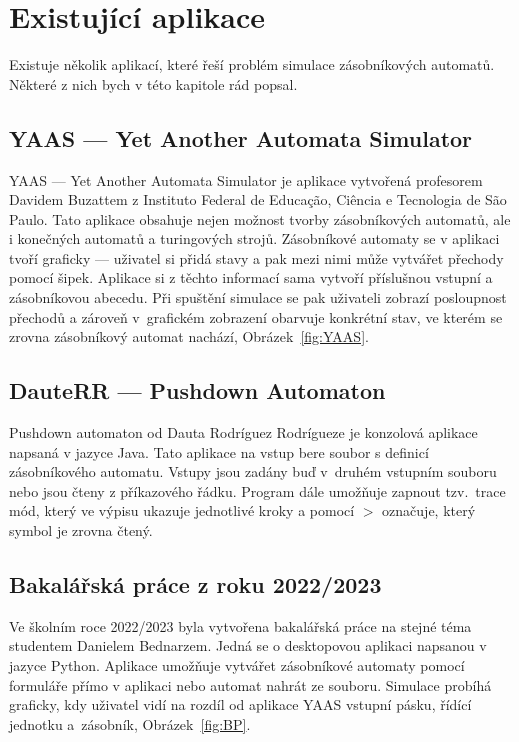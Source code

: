 \chapter{Existující aplikace}\label{chap:ExistingApps}

Existuje několik aplikací, které řeší problém simulace zásobníkových automatů. Některé z nich bych v této kapitole rád popsal.~\cite{Buzatto2023}~\cite{Rodriguez2018}~\cite{Bednarz2023}

\section{YAAS --- Yet Another Automata Simulator}

YAAS --- Yet Another Automata Simulator je aplikace vytvořená profesorem Davidem Buzattem z Instituto Federal de Educação, Ciência e Tecnologia de São Paulo. Tato aplikace obsahuje nejen možnost tvorby zásobníkových automatů, ale i konečných automatů a turingových strojů. Zásobníkové automaty se v aplikaci tvoří graficky --- uživatel si přidá stavy a pak mezi nimi může vytvářet přechody pomocí šipek. Aplikace si z těchto informací sama vytvoří příslušnou vstupní a zásobníkovou abecedu. Při spuštění simulace se pak uživateli zobrazí posloupnost přechodů a zároveň v~grafickém zobrazení obarvuje konkrétní stav, ve kterém se zrovna zásobníkový automat nachází, Obrázek~\ref{fig:YAAS}.

\section{DauteRR --- Pushdown Automaton}

Pushdown automaton od Dauta Rodríguez Rodrígueze je konzolová aplikace napsaná v jazyce Java. Tato aplikace na vstup bere soubor s definicí zásobníkového automatu. Vstupy jsou zadány buď v~druhém vstupním souboru nebo jsou čteny z příkazového řádku. Program dále umožňuje zapnout tzv.~trace mód, který ve výpisu ukazuje jednotlivé kroky a pomocí $>$ označuje, který symbol je zrovna čtený.

\section{Bakalářská práce z roku 2022/2023}

Ve školním roce 2022/2023 byla vytvořena bakalářská práce na stejné téma studentem Danielem Bednarzem. Jedná se o desktopovou aplikaci napsanou v jazyce Python. Aplikace umožňuje vytvářet zásobníkové automaty pomocí formuláře přímo v aplikaci nebo automat nahrát ze souboru. Simulace probíhá graficky, kdy uživatel vidí na rozdíl od aplikace YAAS vstupní pásku, řídící jednotku a~zásobník, Obrázek~\ref{fig:BP}.

